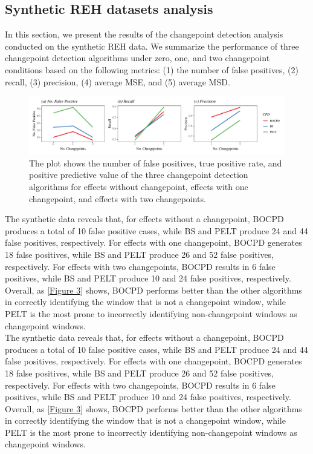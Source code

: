 \documentclass[]{interact}
\theoremstyle{plain}%
\theoremstyle{definition}
\theoremstyle{remark}
\begin{document}
{	\subsection{Synthetic REH datasets analysis} \label{res:simulation}
	
	\hspace{0.28cm} In this section, we present the results of the changepoint detection analysis conducted on the synthetic REH data. We summarize the performance of three changepoint detection algorithms under zero, one, and two changepoint conditions based on the following metrics: (1) the number of false positives, (2) recall, (3) precision, (4) average MSE, and (5) average MSD.
	
	\begin{figure}[h]
		\captionsetup{justification=raggedright}
		\renewcommand{\figurename}{Figure}
		\centering
		\includegraphics[width=\textwidth,height=\textheight,keepaspectratio]{FPTPRPPV}
		\caption{\fontsize{8}{10}\selectfont The plot shows the number of false positives, true positive rate, and positive predictive value of the three changepoint detection algorithms for effects without changepoint, effects with one changepoint, and effects with two changepoints.}
		\label{Figure 3}
	\end{figure}
	
	The synthetic data reveals that, for effects without a changepoint, BOCPD produces a total of 10 false positive cases, while BS and PELT produce 24 and 44 false positives, respectively. For effects with one changepoint, BOCPD generates 18 false positives, while BS and PELT produce 26 and 52 false positives, respectively. For effects with two changepoints, BOCPD results in 6 false positives, while BS and PELT produce 10 and 24 false positives, respectively. Overall, as \autoref{Figure 3} shows, BOCPD performs better than the other algorithms in correctly identifying the window that is not a changepoint window, while PELT is the most prone to incorrectly identifying non-changepoint windows as changepoint windows. \\
	
	The synthetic data reveals that, for effects without a changepoint, BOCPD produces a total of 10 false positive cases, while BS and PELT produce 24 and 44 false positives, respectively. For effects with one changepoint, BOCPD generates 18 false positives, while BS and PELT produce 26 and 52 false positives, respectively. For effects with two changepoints, BOCPD results in 6 false positives, while BS and PELT produce 10 and 24 false positives, respectively. Overall, as \autoref{Figure 3} shows, BOCPD performs better than the other algorithms in correctly identifying the window that is not a changepoint window, while PELT is the most prone to incorrectly identifying non-changepoint windows as changepoint windows.
	
}
\end{document}
